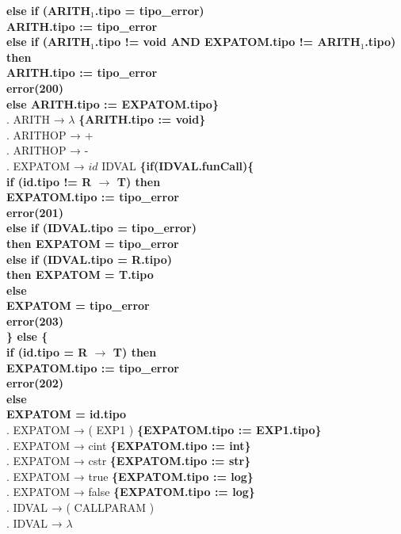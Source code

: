 \begin{tabbing}
    \>                     \> \textbf{else if (ARITH$_1$.tipo = tipo\_error)}\\     \> \> \> \textbf{ARITH.tipo := tipo\_error}\\
    \>                     \> \textbf{else if (ARITH$_1$.tipo != void AND EXPATOM.tipo != ARITH$_1$.tipo) then}\\ 
    \> \> \> \textbf{ARITH.tipo := tipo\_error}\\
    \>                     \> \> \textbf{error(200)}\\
    \>                     \> \textbf{else ARITH.tipo := EXPATOM.tipo\}}\\
    . ARITH → $\lambda$ \textbf{\{ARITH.tipo := void\}}\\
    . ARITHOP → +\\
    . ARITHOP → -\\
    . EXPATOM → $id$ IDVAL \textbf{\{if(IDVAL.funCall)\{}\\
    \> \> \> \textbf{if (id.tipo != R $\rightarrow$ T) then}\\
    \> \> \> \> \textbf{EXPATOM.tipo := tipo\_error}\\
    \> \> \> \> \textbf{error(201)}\\
    \> \> \> \textbf{else if (IDVAL.tipo = tipo\_error)}\\
    \> \> \> \> \textbf{then EXPATOM = tipo\_error}\\
    \> \> \> \textbf{else if (IDVAL.tipo = R.tipo)}\\
    \> \> \> \> \textbf{then EXPATOM = T.tipo}\\
    \> \> \> \textbf{else}\\
    \> \> \> \> \textbf{EXPATOM = tipo\_error}\\
    \> \> \> \> \textbf{error(203)}\\
    \> \> \textbf{\} else \{}\\
    \> \> \> \textbf{if (id.tipo = R $\rightarrow$ T) then}\\
    \> \> \> \> \textbf{EXPATOM.tipo := tipo\_error}\\
    \> \> \> \> \textbf{error(202)}\\
    \> \> \> \textbf{else}\\
    \> \> \> \> \textbf{EXPATOM = id.tipo}\\
    . EXPATOM → ( EXP1 ) \>\textbf{\{EXPATOM.tipo := EXP1.tipo\}}\\
    . EXPATOM → cint \>\textbf{\{EXPATOM.tipo := int\}}\\
    . EXPATOM → cstr \>\textbf{\{EXPATOM.tipo := str\}}\\
    . EXPATOM → true \>\textbf{\{EXPATOM.tipo := log\}}\\
    . EXPATOM → false \>\textbf{\{EXPATOM.tipo := log\}}\\
    . IDVAL → ( CALLPARAM )\\
    . IDVAL → $\lambda$\\
\end{tabbing}
